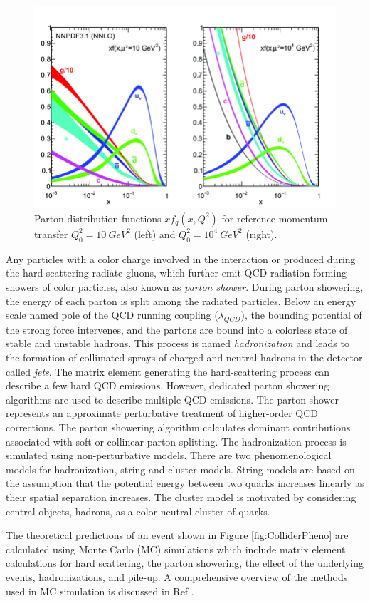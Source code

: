 \begin{figure}[!htb]
\centering
    \includegraphics[width=1\textwidth] {figures/Theory/PDF.png}\hspace{1cm}
    \caption{ Parton distribution functions $xf_{q}(x,Q^2)$ for reference momentum transfer $Q^2_{0} = 10 ~ GeV^2$ (left) and $Q^2_{0} = 10^4~ GeV^{2}$ (right)\cite{PDFFigure}.}
\label{fig:PDFFig}
\end{figure}

Any particles with a color charge involved in the interaction or produced during the hard scattering radiate gluons, which further emit QCD radiation forming showers of color particles, also known as \textit{parton shower}. During parton showering, the energy of each parton is split among the radiated particles. Below an energy scale named pole of the QCD running coupling ($\lambda_{QCD}$), the bounding potential of the strong force intervenes, and the partons are bound into a colorless state of stable and unstable hadrons. This process is named \textit{hadronization} and leads to the formation of collimated sprays of charged and neutral hadrons in the detector called \textit{jets}. The matrix element generating the hard-scattering process can describe a few hard QCD emissions. However, dedicated parton showering algorithms are used to describe multiple QCD emissions. The parton shower represents an approximate perturbative treatment of higher-order QCD corrections. The parton showering algorithm calculates dominant contributions associated with soft or collinear parton splitting. The hadronization process is simulated using non-perturbative models. There are two phenomenological models for hadronization, string and cluster models. String models are based on the assumption
that the potential energy between two quarks increases linearly as their spatial separation increases. The cluster model is motivated by considering central objects, hadrons, as a color-neutral cluster of quarks.

The theoretical predictions of an event shown in Figure \ref{fig:ColliderPheno} are calculated using Monte Carlo (MC) simulations which include matrix element calculations for hard scattering, the parton showering, the effect of the underlying events, hadronizations, and pile-up. A comprehensive overview of the methods used in MC simulation is discussed in Ref \cite{EventGenerator}.
